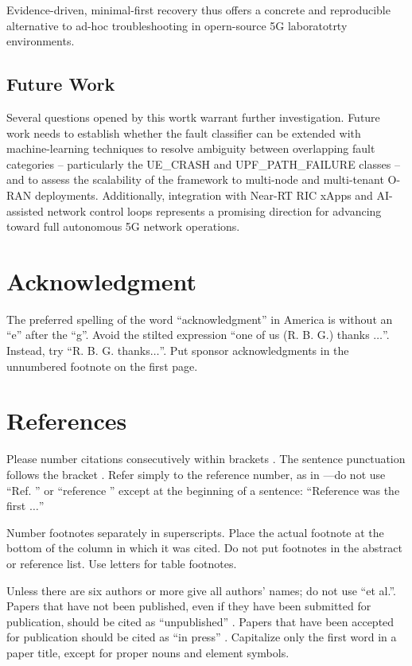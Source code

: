 \documentclass[conference]{IEEEtran}
\begin{document}
Evidence-driven, minimal-first recovery thus offers a concrete and reproducible alternative to ad-hoc troubleshooting in opern-source 5G laboratotrty environments.\\

\subsection{Future Work}
Several questions opened by this wortk warrant further investigation. Future work needs to establish whether the fault classifier can be extended with machine-learning techniques to resolve ambiguity between overlapping fault categories -- particularly the UE\_CRASH and UPF\_PATH\_FAILURE classes -- and to assess the scalability of the framework to multi-node and multi-tenant O-RAN deployments. Additionally, integration with Near-RT RIC xApps and AI-assisted network control loops represents a promising direction for advancing toward full autonomous 5G network operations.


\section*{Acknowledgment}

The preferred spelling of the word ``acknowledgment'' in America is without 
an ``e'' after the ``g''. Avoid the stilted expression ``one of us (R. B. 
G.) thanks $\ldots$''. Instead, try ``R. B. G. thanks$\ldots$''. Put sponsor 
acknowledgments in the unnumbered footnote on the first page.

\section*{References}

Please number citations consecutively within brackets \cite{b1}. The 
sentence punctuation follows the bracket \cite{b2}. Refer simply to the reference 
number, as in \cite{b3}---do not use ``Ref. \cite{b3}'' or ``reference \cite{b3}'' except at 
the beginning of a sentence: ``Reference \cite{b3} was the first $\ldots$''

Number footnotes separately in superscripts. Place the actual footnote at 
the bottom of the column in which it was cited. Do not put footnotes in the 
abstract or reference list. Use letters for table footnotes.

Unless there are six authors or more give all authors' names; do not use 
``et al.''. Papers that have not been published, even if they have been 
submitted for publication, should be cited as ``unpublished'' \cite{b4}. Papers 
that have been accepted for publication should be cited as ``in press'' \cite{b5}. 
Capitalize only the first word in a paper title, except for proper nouns and 
element symbols.
\end{document}
